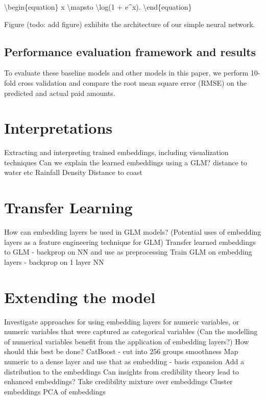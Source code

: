 \documentclass{article}
\begin{document}
\textbackslash begin\{equation\} x \textbackslash mapsto
\textbackslash log(1 + e\^{}x). \textbackslash end\{equation\}

Figure (todo: add figure) exhibits the architecture of our simple neural
network.

\hypertarget{performance-evaluation-framework-and-results}{%
\subsection{Performance evaluation framework and
results}\label{performance-evaluation-framework-and-results}}

To evaluate these baseline models and other models in this paper, we
perform 10-fold cross validation and compare the root mean square error
(RMSE) on the predicted and actual paid amounts.

\hypertarget{interpretation}{%
\section{Interpretations}\label{interpretation}}

Extracting and interpreting trained embeddings, including visualization
techniques Can we explain the learned embeddings using a GLM? distance
to water etc Rainfall Density Distance to coast

\hypertarget{tl}{%
\section{Transfer Learning}\label{tl}}

How can embedding layers be used in GLM models? (Potential uses of
embedding layers as a feature engineering technique for GLM) Transfer
learned embeddings to GLM - backprop on NN and use as preprocessing
Train GLM on embedding layers - backprop on 1 layer NN

\hypertarget{extend}{%
\section{Extending the model}\label{extend}}

Investigate approaches for using embedding layers for numeric variables,
or numeric variables that were captured as categorical variables (Can
the modelling of numerical variables benefit from the application of
embedding layers?) How should this best be done? CatBoost - cut into 256
groups smoothness Map numeric to a dense layer and use that as embedding
- basis expansion Add a distribution to the embeddings Can insights from
credibility theory lead to enhanced embeddings? Take credibility mixture
over embeddings Cluster embeddings PCA of embeddings
\end{document}
